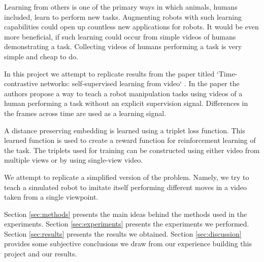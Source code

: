 
Learning from others is one of the primary ways in which animals, humans included, learn to perform new tasks. Augmenting robots with such learning capabilities could open up countless new applications for robots. It would be even more beneficial, if such learning could occur from simple videos of humans demonstrating a task. Collecting videos of humans performing a task is very simple and cheap to do.

In this project we attempt to replicate results from the paper titled `Time-contrastive networks: self-supervised learning from video` \cite{self-supervised-learning}. In the paper the authors propose a way to teach a robot manipulation tasks using videos of a human performing a task without an explicit supervision signal. Differences in the frames across time are used as a learning signal.

A distance preserving embedding is learned using a triplet loss function. This learned function is used to create a reward function for reinforcement learning of the task. The triplets used for training can be constructed using either video from multiple views or by using single-view video.

We attempt to replicate a simplified version of the problem. Namely, we try to teach a simulated robot to imitate itself performing different moves in a video taken from a single viewpoint.

Section \ref{sec:methods} presents the main ideas behind the methods used in the experiments. Section \ref{sec:experiments} presents the experiments we performed. Section \ref{sec:results} presents the results we obtained. Section \ref{sec:discussion} provides some subjective conclusions we draw from our experience building this project and our results.



